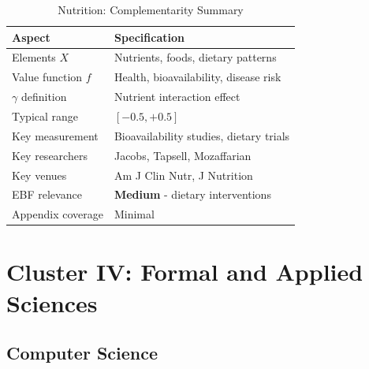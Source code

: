 \begin{table}[h]
\centering
\caption{Nutrition: Complementarity Summary}
\label{tab:nutrition-summary}
\renewcommand{\arraystretch}{1.3}
\small
\begin{tabular}{@{}ll@{}}
\toprule
\textbf{Aspect} & \textbf{Specification} \\
\midrule
Elements $X$ & Nutrients, foods, dietary patterns \\
Value function $f$ & Health, bioavailability, disease risk \\
$\gamma$ definition & Nutrient interaction effect \\
Typical range & $[-0.5, +0.5]$ \\
Key measurement & Bioavailability studies, dietary trials \\
Key researchers & Jacobs, Tapsell, Mozaffarian \\
Key venues & Am J Clin Nutr, J Nutrition \\
EBF relevance & \textbf{Medium} - dietary interventions \\
Appendix coverage & Minimal \\
\bottomrule
\end{tabular}
\end{table}

\section{Cluster IV: Formal and Applied Sciences}
\label{sec:formal}

\subsection{Computer Science}
\label{sec:cs}

